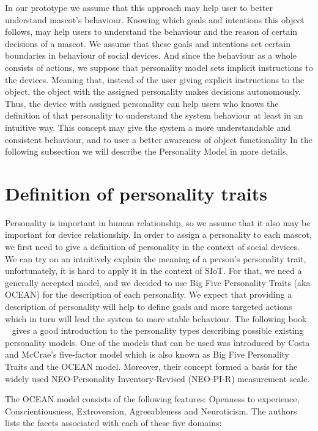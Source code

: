 In our prototype we assume that this approach may help user to better understand mascot's behaviour.
Knowing which goals and intentions this object follows, may help users to understand the
behaviour and the reason of certain decisions of a mascot.
We assume that these goals and intentions set certain boundaries in behaviour of social devices.
And since the behaviour as a whole consists of actions, we suppose that personality
model sets implicit instructions to the devices.
Meaning that, instead of the user giving explicit instructions to the object,
the object with the assigned personality makes decisions autonomously.
Thus, the device with assigned personality can help users who knows the definition
of that personality to understand the system behaviour at least in an intuitive way.
This concept may give the system a more understandable and consistent behaviour,
and to user a better awareness of object functionality
In the following subsection we will describe the Personality Model in more details.

\section{Definition of personality traits}
\label{sec:Definition of Personality Traits}

Personality is important in human relationship, so we assume that it also may be important for device relationship.
In order to assign a personality to each mascot, we first need to give a definition of
personality in the context of social devices.
We can try on an intuitively explain the meaning of a person’s personality trait,
unfortunately, it is hard to apply it in the context of SIoT. For that, we need a generally
accepted model, and we decided to use Big Five Personality Traits (aka OCEAN) for the description of each personality.
We expect that providing a description of personality will help to define goals and
more targeted actions which in turn will lead the system to more stable behaviour.
The following book ~\cite{matthews2003personality} gives a good introduction to the
personality types describing possible existing personality models.
One of the models that can be used was introduced by Costa and McCrae’s five-factor
model which is also known as Big Five Personality Traits and the OCEAN model.
Moreover, their concept formed a basis for the widely used NEO-Personality
Inventory-Revised (NEO-PI-R) measurement scale.

The OCEAN model consists of the following features: Openness to experience,
Conscientiousness, Extroversion, Agreeableness and Neuroticism.
The authors lists the facets associated with each of these five domains:

